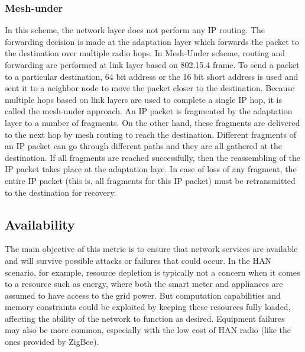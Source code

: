 \documentclass[11pt,draftclsnofoot,onecolumn]{IEEEtran}
\begin{document}
\subsubsection{Mesh-under}
In this scheme, the network layer does not perform any IP routing. The forwarding decision is made at the adaptation layer which forwards the packet to the destination over multiple radio hops. In Mesh-Under scheme, routing and forwarding are performed at link layer based on 802.15.4 frame. To send a packet to a particular destination, 64 bit address or the 16 bit short address is used and sent it to a neighbor node to move the packet closer to the destination. Because multiple hops based on link layers are used to complete a single IP hop, it is called the mesh-under approach. An IP packet is fragmented by the adaptation layer to a number of fragments. On the other hand, these fragments are delivered to the next hop by mesh routing to reach the destination. Different fragments of an IP packet can go through different paths and they are all gathered at the destination. If all fragments are reached successfully, then the reassembling of the IP packet takes place at the adaptation laye. In case of loss of any fragment, the entire IP packet (this is, all fragments for this IP packet) must be retransmitted to the destination for recovery.

\subsection{Availability}

The main objective of this metric is to ensure that network services are available and will survive possible attacks or failures that could occur. In the HAN scenario, for example, resource depletion is typically not a concern when it comes to a resource such as energy, where both the smart meter and appliances are assumed to have access to the grid power. But computation capabilities and memory constraints could be exploited by keeping these resources fully loaded, affecting the ability of the network to function as desired. Equipment failures may also be more common, especially with the low cost of HAN radio (like the ones provided by ZigBee).
\end{document}

